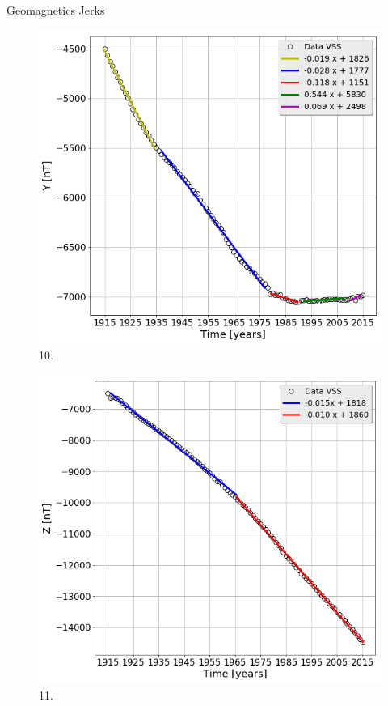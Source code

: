 \documentclass[final,t]{beamer}
\begin{document}
\begin{columns}[t]
\begin{column}{.66\linewidth}
\begin{columns}
\begin{column}{.31\linewidth}
\begin{block}{Geomagnetics Jerks}
		
		\begin{figure}
			\centering
			\includegraphics[scale=0.8]{"figs_ed/Linear regression Y_v3"}
			\caption{10.}
			\label{fintetico}
		\end{figure}	
		
		
		\begin{figure}
			\centering
			\includegraphics[scale=0.8]{"figs_ed/Linear regression Z_v3"}
			\caption{11.}
			\label{fig:g_Sintetico}
		\end{figure}


\end{block}
\end{column}
\end{columns}
\end{column}
\end{columns}
\end{document}
